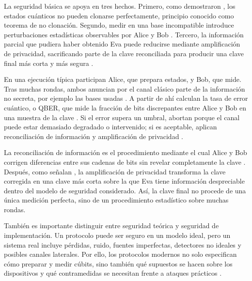 La seguridad básica se apoya en tres hechos. Primero, como demostraron \cite{wootters1982}, los estados cuánticos no pueden clonarse perfectamente, principio conocido como teorema de no clonación. Segundo, medir en una base incompatible introduce perturbaciones estadísticas observables por Alice y Bob \citep{bennett1984,nielsen2010}. Tercero, la información parcial que pudiera haber obtenido Eva puede reducirse mediante amplificación de privacidad, sacrificando parte de la clave reconciliada para producir una clave final más corta y más segura \citep{gisin2002,scarani2009}.

En una ejecución típica participan Alice, que prepara estados, y Bob, que mide. Tras muchas rondas, ambos anuncian por el canal clásico parte de la información no secreta, por ejemplo las bases usadas \citep{bennett1984,gisin2002}. A partir de ahí calculan la tasa de error cuántico, o QBER, que mide la fracción de bits discrepantes entre Alice y Bob en una muestra de la clave \citep{gisin2002,scarani2009}. Si el error supera un umbral, abortan porque el canal puede estar demasiado degradado o intervenido; si es aceptable, aplican reconciliación de información y amplificación de privacidad \citep{scarani2009,lo2014}.

La reconciliación de información es el procedimiento mediante el cual Alice y Bob corrigen diferencias entre sus cadenas de bits sin revelar completamente la clave \citep{gisin2002,scarani2009}. Después, como señalan \cite{scarani2009}, la amplificación de privacidad transforma la clave corregida en una clave más corta sobre la que Eva tiene información despreciable dentro del modelo de seguridad considerado. Así, la clave final no procede de una única medición perfecta, sino de un procedimiento estadístico sobre muchas rondas.

También es importante distinguir entre seguridad teórica y seguridad de implementación. Un protocolo puede ser seguro en un modelo ideal, pero un sistema real incluye pérdidas, ruido, fuentes imperfectas, detectores no ideales y posibles canales laterales. Por ello, los protocolos modernos no solo especifican cómo preparar y medir cúbits, sino también qué supuestos se hacen sobre los dispositivos y qué contramedidas se necesitan frente a ataques prácticos \citep{scarani2009,lo2014}.
